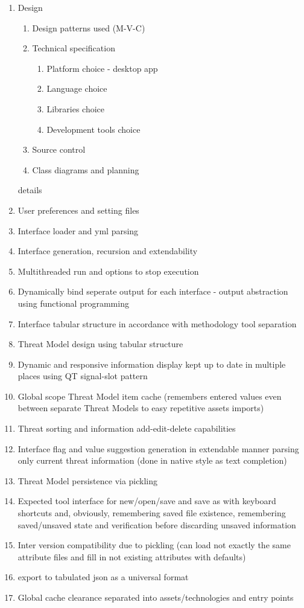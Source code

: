 \begin{enumerate}
	\item Design
	\begin{enumerate}
		\item Design patterns used (M-V-C)
		\item Technical specification
		\begin{enumerate}
			\item Platform choice - desktop app
			\item Language choice
			\item Libraries choice
			\item Development tools choice
		\end{enumerate}
	\item Source control
	\item Class diagrams and planning
	
	\end{enumerate}

	\Implementation details
	
	\item User preferences and setting files
	\item Interface loader and yml parsing
	\item Interface generation, recursion and extendability
	\item Multithreaded run and options to stop execution
	\item Dynamically bind seperate output for each interface - output abstraction using functional programming
	\item Interface tabular structure in accordance with methodology tool separation
	
	\item Threat Model design using tabular structure 
	\item Dynamic and responsive information display kept up to date in multiple places using QT signal-slot pattern
	\item Global scope Threat Model item cache (remembers entered values even between separate Threat Models to easy repetitive assets imports)
	\item Threat sorting and information add-edit-delete capabilities
	\item Interface flag and value suggestion generation in extendable manner parsing only current threat information (done in native style as text completion)
	
	\item Threat Model persistence via pickling
	\item Expected tool interface for new/open/save and save as with keyboard shortcuts and, obviously, remembering saved file existence, remembering saved/unsaved state and verification before discarding unsaved information
	\item Inter version compatibility due to pickling (can load not exactly the same attribute files and fill in not existing attributes with defaults)
	\item export to tabulated json as a universal format
	\item Global cache clearance separated into assets/technologies and entry points
  
\end{enumerate}

